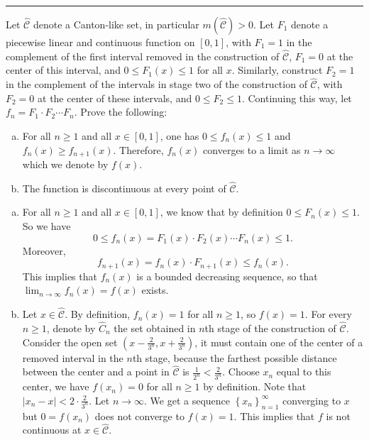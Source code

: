 \documentclass[letterpaper, 12pt]{article}
\begin{document}
\noindent\rule{7in}{2.8pt}
\newpage 
\begin{problem}{1.10}
Let \(\hat{\mathcal{C}}\) denote a Canton-like set, in particular \(m(\hat{\mathcal{C}})>0\). Let \(F_1\) denote a piecewise linear and continuous function on \([0,1]\), with \(F_1=1\) in the complement of the first interval removed in the construction of \(\hat{\mathcal{C}}\), \(F_1=0\) at the center of this interval, and \(0\leq F_1(x)\leq 1\) for all \(x\). Similarly, construct \(F_2=1\) in the complement of the intervals in stage two of the construction of \(\hat{\mathcal{C}}\), with \(F_2=0\) at the center of these intervals, and \(0\leq F_2\leq 1\). Continuing this way, let \(f_n=F_1\cdot F_2\cdots F_n\). Prove the following:
\begin{enumerate}[(a)]
    \item For all \(n\geq 1\) and all \(x\in [0,1]\), one has \(0\leq f_n(x)\leq 1\) and \(f_n(x)\geq f_{n+1}(x)\). Therefore, \(f_n(x)\) converges to a limit as \(n\to \infty\) which we denote by \(f(x)\). 
    \item The function is discontinuous at every point of \(\hat{\mathcal{C}}\). 
\end{enumerate}
\end{problem}
\begin{solution}
\begin{enumerate}[(a)]
  \item For all \(n\geq 1\) and all \(x\in [0,1]\), we know that by definition \(0\leq F_n(x)\leq 1\). So we have 
  \[0\leq f_n(x)=F_1(x)\cdot F_2(x)\cdots F_n(x)\leq 1.\]
  Moreover, 
  \[f_{n+1}(x)=f_n(x)\cdot F_{n+1}(x)\leq f_n(x).\]
  This implies that \(f_n(x)\) is a bounded decreasing sequence, so that \(\lim_{n\to \infty}f_n(x)=f(x)\) exists.
  \item Let \(x\in \hat{\mathcal{C}}\). By definition, \(f_n(x)=1\) for all \(n\geq 1\), so \(f(x)=1\). For every \(n\geq 1\), denote by \(\hat{C}_n\) the set obtained in \(n\)th stage of the construction of \(\hat{\mathcal{C}}\). Consider the open set \((x-\frac{2}{3^n},x+\frac{2}{3^n})\), it must contain one of the center of a removed interval in the \(n\)th stage, because the farthest possible distance between the center and a point in \(\hat{\mathcal{C}}\) is \(\frac{1}{2^n}<\frac{2}{3^n}\). Choose \(x_n\) equal to this center, we have \(f(x_n)=0\) for all \(n\geq 1\) by definition. Note that \(|x_n-x|<2\cdot \frac{2}{3^n}\). Let \(n\to \infty\). We get a sequence \(\left\{ x_n \right\}_{n=1}^\infty\) converging to \(x\) but \(0=f(x_n)\) does not converge to \(f(x)=1\). This implies that \(f\) is not continuous at \(x\in \hat{\mathcal{C}}\).
\end{enumerate}
\end{solution}
\end{document}
